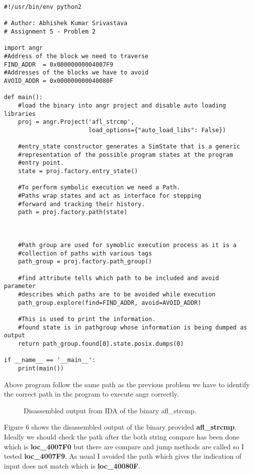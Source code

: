 \documentclass[a4paper, 12pt]{article}
\begin{document}
\begin{lstlisting}
#!/usr/bin/env python2

# Author: Abhishek Kumar Srivastava
# Assignment 5 - Problem 2

import angr
#Address of the block we need to traverse
FIND_ADDR  = 0x00000000004007F9
#Addresses of the blocks we have to avoid
AVOID_ADDR = 0x000000000040080F

def main():
    #load the binary into angr project and disable auto loading libraries
    proj = angr.Project('afl_strcmp', 
                        load_options={"auto_load_libs": False})
    
    #entry_state constructor generates a SimState that is a generic
    #representation of the possible program states at the program 
    #entry point.
    state = proj.factory.entry_state()
    
    #To perform symbolic execution we need a Path.
    #Paths wrap states and act as interface for stepping 
    #forward and tracking their history.
    path = proj.factory.path(state)
    
    
    
    #Path group are used for symoblic execution process as it is a
    #collection of paths with various tags
    path_group = proj.factory.path_group()
    
    #find attribute tells which path to be included and avoid parameter 
    #describes which paths are to be avoided while execution
    path_group.explore(find=FIND_ADDR, avoid=AVOID_ADDR)
    
    #This is used to print the information.
    #found state is in pathgroup whose information is being dumped as output 
    return path_group.found[0].state.posix.dumps(0)

if __name__ == '__main__':
    print(main())

\end{lstlisting}

Above program follow the same path as the previous problem we have to identify the correct path in the program to execute angr correctly.
\begin{figure}[h]
	\centering
	\caption{Disassembled output from IDA of the binary afl\_strcmp.}
\end{figure}

Figure 6 shows the disassembled output of the binary provided \textbf{afl\_strcmp}. Ideally we should check the path after the both string compare has been done which is \textbf{loc\_4007F0} but there are compare and jump methods are called so I tested \textbf{loc\_4007F9}. As usual I avoided the path which gives the indication of input does not match which is \textbf{loc\_40080F}.\\
\end{document}
